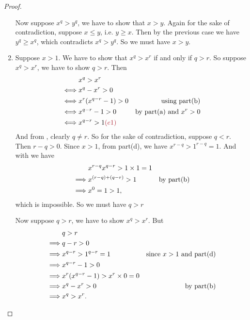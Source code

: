 \begin{proof}
\begin{enumerate}
    Now suppose \(x^q > y^q\), we have to show that \(x > y\).
    Again for the sake of contradiction, suppose \(x \le y\), i.e. \(y \ge x\).
    Then by the previous case we have \(y^q \ge x^q\), which contradicts \(x^q > y^q\).
    So we must have \(x > y\).
\item
    Suppose \(x > 1\).
    We have to show that \(x^q > x^r\) if and only if \(q > r\).
    So suppose \(x^q > x^r\), we have to show \(q > r\).
    Then
    \begin{align*}
             & x^q > x^r \\
        \iff & x^q - x^r > 0 \\
        \iff & x^r(x^{q - r} - 1) > 0 & \text{using part(b)} \\
        \iff & x^{q - r} - 1 > 0 & \text{by part(a) and \(x^r > 0\)} \\
        \iff & x^{q - r} > 1 \MAROON{(e1)}
    \end{align*}
    And from , clearly \(q \ne r\).
    So for the sake of contradiction, suppose \(q < r\).
    Then \(r - q > 0\).
    Since \(x > 1\), from part(d), we have \(x^{r - q} > 1^{r - q} = 1\).
    And with  we have
    \begin{align*}
                 & x^{r - q} x^{q - r} > 1 \times 1 = 1 \\
        \implies & x^{(r - q) + (q - r)} > 1 & \text{by part(b)} \\
        \implies & x^0 = 1 > 1,
    \end{align*}
    which is impossible.
    So we must have \(q > r\)

    Now suppose \(q > r\), we have to show \(x^q > x^r\).
    But
    \begin{align*}
                 & q > r \\
        \implies & q - r > 0 \\
        \implies & x^{q - r} > 1^{q - r} = 1 & \text{since \(x > 1\) and part(d)} \\
        \implies & x^{q - r} - 1 > 0 \\
        \implies & x^r(x^{q - r} - 1) > x^r \times 0 = 0 \\
        \implies & x^q - x^r > 0 & \text{by part(b)} \\
        \implies & x^q > x^r.
    \end{align*}
    

\end{enumerate}
\end{proof}
